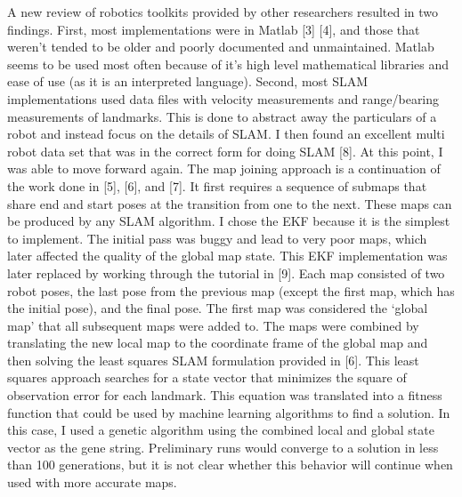 \documentclass[12pt]{report}
\begin{document}
A new review of robotics toolkits provided by other researchers resulted in two findings.  First, most implementations were in Matlab [3] [4], and those that weren’t tended to be older and poorly documented and unmaintained.  Matlab seems to be used most often because of it’s high level mathematical libraries and ease of use (as it is an interpreted language).  Second, most SLAM implementations used data files with velocity measurements and range/bearing measurements of landmarks.  This is done to abstract away the particulars of a robot and instead focus on the details of SLAM.  I then found an excellent multi robot data set that was in the correct form for doing SLAM [8].
At this point, I was able to move forward again.  The map joining approach is a continuation of the work done in [5], [6], and [7].  It first requires a sequence of submaps that share end and start poses at the transition from one to the next.  These maps can be produced by any SLAM algorithm.  I chose the EKF because it is the simplest to implement.  The initial pass was buggy and lead to very poor maps, which later affected the quality of the global map state.  This EKF implementation was later replaced by working through the tutorial in [9].  
Each map consisted of two robot poses, the last pose from the previous map (except the first map, which has the initial pose), and the final pose.  The first map was considered the ‘global map’ that all subsequent maps were added to.  The maps were combined by translating the new local map to the coordinate frame of the global map and then solving the least squares SLAM formulation provided in [6].  This least squares approach searches for a state vector that minimizes the square of observation error for each landmark.  This equation was translated into a fitness function that could be used by machine learning algorithms to find a solution.  In this case, I used a genetic algorithm using the combined local and global state vector as the gene string.  Preliminary runs would converge to a solution in less than 100 generations, but it is not clear whether this behavior will continue when used with more accurate maps.  
\end{document}
